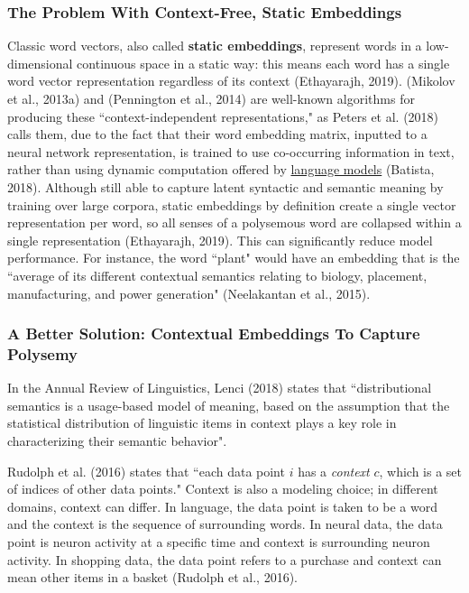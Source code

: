 \subsubsection{The Problem With Context-Free, Static Embeddings} \label{sec:ProblemWithStaticEmbs}

Classic word vectors, also called \textbf{static embeddings}, represent words in a low-dimensional continuous space in a static way: this means each word has a single word vector representation regardless of its context (Ethayarajh, 2019).  (Mikolov et al., 2013a) and  (Pennington et al., 2014) are well-known algorithms for producing these ``context-independent representations," as Peters et al. (2018) calls them, due to the fact that their word embedding matrix, inputted to a neural network representation, is trained to use co-occurring information in text, rather than using dynamic computation offered by \hyperref[sec:LanguageModels]{language models} (Batista, 2018). Although still able to capture latent syntactic and semantic meaning by training over large corpora, static embeddings by definition create a single vector representation per word, so all senses of a polysemous word are collapsed within a single representation (Ethayarajh, 2019). This can significantly reduce model performance. For instance, the word ``plant" would have an embedding that is the ``average of its different contextual semantics relating to biology, placement, manufacturing, and power generation" (Neelakantan et al., 2015). 

\subsubsection{A Better Solution: Contextual Embeddings To Capture Polysemy} \label{sec:SolutionWithContextEmbs}

In the Annual Review of Linguistics, Lenci (2018) states that ``distributional semantics is a usage-based model of meaning, based on the assumption that the statistical distribution of linguistic items in context plays a key role in characterizing their semantic behavior".

Rudolph et al. (2016) states that ``each data point $i$ has a \emph{context} $c$, which is a set of indices of other data points." Context is also a modeling choice; in different domains, context can differ. In language, the data point is taken to be a word and the context is the sequence of surrounding words. In neural data, the data point is neuron activity at a specific time and context is surrounding neuron activity. In shopping data, the data point refers to a purchase and context can mean other items in a basket (Rudolph et al., 2016). 

